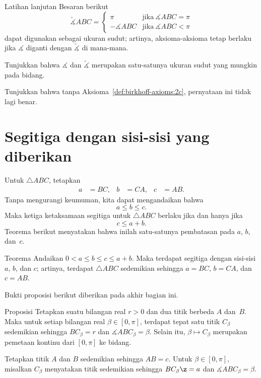 \begin{thm}{Latihan lanjutan}\label{ex:angle-measures}
Besaran berikut 
$$\tilde\measuredangle ABC=
\begin{cases}
\pi&\text{jika}\ \measuredangle ABC=\pi
\\
-\measuredangle ABC&\text{jika}\ \measuredangle ABC<\pi
\end{cases}
$$
dapat digunakan sebagai ukuran sudut; 
artinya, aksioma-aksioma tetap berlaku jika $\measuredangle$ diganti dengan $\tilde\measuredangle$ di mana-mana.

Tunjukkan bahwa $\measuredangle$ dan $\tilde\measuredangle$ merupakan satu-satunya ukuran sudut yang mungkin pada bidang. 

Tunjukkan bahwa tanpa Aksioma~\ref{def:birkhoff-axioms:2c}, pernyataan ini tidak lagi benar.
\end{thm}

\section{Segitiga dengan sisi-sisi yang diberikan}

Untuk $\triangle ABC$, tetapkan 
\begin{align*}
a&=BC,
&
b&=CA,
&
c&=AB.
\end{align*}
Tanpa mengurangi keumuman, kita dapat mengandaikan bahwa 
\[a\le b \le c.\]
Maka ketiga ketaksamaan segitiga untuk $\triangle ABC$
berlaku jika dan hanya jika 
\[c\le a+b.\]
Teorema berikut menyatakan bahwa inilah satu-satunya pembatasan pada $a$, $b$, dan~$c$.

\begin{thm}[\abs]{Teorema}\label{thm:abc}
Andaikan $0<a\le b\le c\le a+b$.
Maka terdapat segitiga dengan sisi-sisi $a$, $b$, dan $c$;
artinya, terdapat $\triangle ABC$ 
sedemikian sehingga $a=BC$, $b=CA$, dan $c=AB$.
\end{thm}

Bukti proposisi berikut diberikan pada akhir bagian ini.

\begin{thm}[\abs]{Proposisi}\label{prop:C-cont}
Tetapkan suatu bilangan real $r>0$ 
dan dua titik berbeda $A$ dan~$B$.
Maka untuk 
setiap bilangan real $\beta\in [0,\pi]$,
terdapat tepat satu titik $C_\beta$ sedemikian sehingga $BC_\beta=r$
dan $\measuredangle ABC_\beta=\beta$.
Selain itu, $\beta\mapsto C_\beta$ 
merupakan pemetaan kontinu dari $[0,\pi]$ ke bidang.
\end{thm}

\label{page:proof:thm:abc}
Tetapkan titik $A$ dan $B$ sedemikian sehingga $AB=c$.
Untuk $\beta\in [0,\pi]$,
misalkan $C_\beta$ menyatakan titik sedemikian sehingga $BC_\beta\z=a$ dan $\measuredangle ABC_\beta=\beta$.

